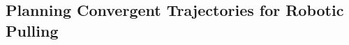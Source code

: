 \documentclass[conference]{IEEEtran}
\newcommand{\EH}[1]{{\color{blue} {Eric: {#1}}  }}
\begin{document}



\subsection{Planning Convergent Trajectories for Robotic
  Pulling}\label{sec:diff-dynam-progr}
\end{document}
